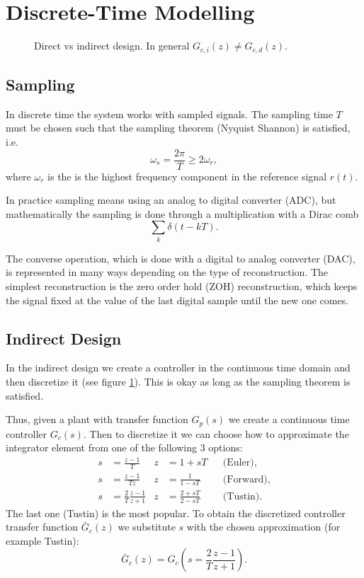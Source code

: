 
\section{Discrete-Time Modelling}

\begin{figure}
	\centering
	
	\caption{
		Direct vs indirect design. In general \(G_{c,i}(z) \neq G_{c,d}(z)\).
		\label{fig:direct-vs-indirect}
	}
\end{figure}

\subsection{Sampling}

In discrete time the system works with sampled signals. The sampling time \(T\) must be chosen such that the sampling theorem (Nyquist Shannon) is satisfied, i.e.
\[
	\omega_s = \frac{2\pi}{T} \geq 2 \omega_r,
\]
where \(\omega_r\) is the is the highest frequency component in the reference signal \(r(t)\).

In practice sampling means using an analog to digital converter (ADC), but mathematically the sampling is done through a multiplication with a Dirac comb
\[
	\sum_k \delta(t - kT).
\]

The converse operation, which is done with a digital to analog converter (DAC), is represented in many ways depending on the type of reconstruction. The simplest reconstruction is the zero order hold (ZOH) reconstruction, which keeps the signal fixed at the value of the last digital sample until the new one comes.

\subsection{Indirect Design}

In the indirect design we create a controller in the continuous time domain and then discretize it (see figure \ref{fig:direct-vs-indirect}). This is okay as long as the sampling theorem is satisfied.

Thus, given a plant with transfer function \(G_p(s)\) we create a continuous time controller \(G_c(s)\). Then to discretize it we can choose how to approximate the integrator element from one of the following 3 options:
\begin{align*}
	s & = \frac{z - 1}{T}                & z & = 1 + sT                && \text{(Euler)},   \\
	s & = \frac{z - 1}{Tz}               & z & = \frac{1}{1 - sT}      && \text{(Forward)}, \\
	s & = \frac{2}{T}\frac{z - 1}{z + 1} & z & = \frac{2 + sT}{2 - sT} && \text{(Tustin)}.
\end{align*}
The last one (Tustin) is the most popular. To obtain the discretized controller transfer function \(\bar{G}_c(z)\) we substitute \(s\) with the chosen approximation (for example Tustin):
\[
	\bar{G}_c(z) = G_c \left(s = \frac{2}{T} \frac{z - 1}{z + 1}\right).
\]


